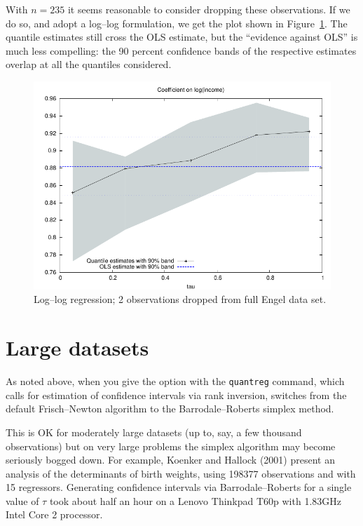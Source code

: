 With $n = 235$ it seems reasonable to consider dropping these
observations.  If we do so, and adopt a log--log formulation, we get
the plot shown in Figure~\ref{fig:tau2}.  The quantile estimates still
cross the OLS estimate, but the ``evidence against OLS'' is much less
compelling: the 90 percent confidence bands of the respective
estimates overlap at all the quantiles considered.

\begin{figure}
  \centering
  \includegraphics{figures/tau-sequence2}
  \caption{Log--log regression; 2 observations dropped from full Engel data
    set.}
  \label{fig:tau2}
\end{figure}


\section{Large datasets}
\label{sec:bigdata}

As noted above, when you give the  option with the
\texttt{quantreg} command, which calls for estimation of confidence
intervals via rank inversion,  switches from the default
Frisch--Newton algorithm to the Barrodale--Roberts simplex method.

This is OK for moderately large datasets (up to, say, a few thousand
observations) but on very large problems the simplex algorithm may
become seriously bogged down.  For example, Koenker and Hallock (2001)
present an analysis of the determinants of birth weights, using 
198377 observations and with 15 regressors.  Generating confidence
intervals via Barrodale--Roberts for a single value of $\tau$ took
about half an hour on a Lenovo Thinkpad T60p with 1.83GHz Intel Core 2
processor.

